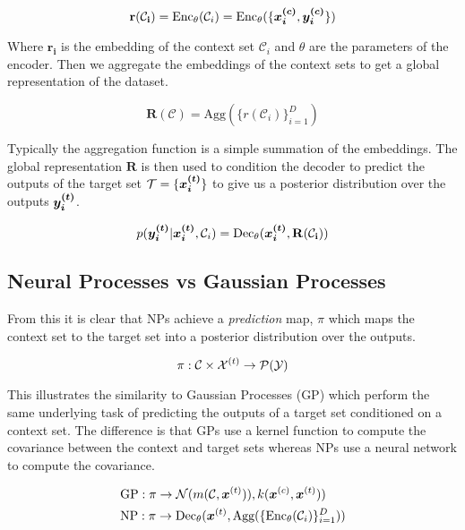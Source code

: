 \documentclass[main.tex]{subfiles}
\begin{document}
\begin{equation}
    \mathbf{r(\mathcal{C}_i)} = \text{Enc}_\theta(\mathcal{C}_i) = \text{Enc}_\theta(\{ \bm{x_{i}^{(c)}}, \bm{y_i^{(c)}} \})
\end{equation}

Where $\mathbf{r_i}$ is the embedding of the context set $\mathcal{C}_i$ and $\theta$ are the parameters of the encoder. Then we aggregate the embeddings of the context sets to get a global representation of the dataset. 

\begin{equation}
    \mathbf{R(\mathcal{C})} = \text{Agg}(\{ r(\mathcal{C}_i) \}_{i=1}^D)
\end{equation}

Typically the aggregation function is a simple summation of the embeddings. The global representation $\mathbf{R}$ is then used to condition the decoder to predict the outputs of the target set $\mathcal{T} = \{ \bm{x_{i}^{(t)}} \}$ to give us a posterior distribution over the outputs $\bm{y_i^{(t)}}$.

\begin{equation}
    p(\bm{y_i^{(t)}} | \bm{x_i^{(t)}}, \mathcal{C}_i) = \text{Dec}_\theta(\bm{x_i^{(t)}}, \mathbf{R(\mathcal{C}_i)})
\end{equation}

\subsection{Neural Processes vs Gaussian Processes}

From this it is clear that NPs achieve a \emph{prediction} map, $\pi$ which maps the context set to the target set into a posterior distribution over the outputs. 

\begin{equation}
    \pi: \mathcal{C} \times \mathcal{X}^{(t)} \rightarrow \mathcal{P}(\mathcal{Y})
\end{equation}


This illustrates the similarity to Gaussian Processes (GP) \cite{books/lib/RasmussenW06} which perform the same underlying task of predicting the outputs of a target set conditioned on a context set. The difference is that GPs use a kernel function to compute the covariance between the context and target sets whereas NPs use a neural network to compute the covariance.

\begin{align}
    &\text{GP}: \pi \rightarrow \mathcal{N}(m(
    \mathcal{C}, \bm{x}^{(t)})
    ), k(\bm{x}^{(c)}, \bm{x}^{(t)})) \\
    &\text{NP}: \pi \rightarrow \text{Dec}_\theta(\bm{x}^{(t)},  
    \text{Agg}(\{ \text{Enc}_\theta(\mathcal{C}_i) \}_{i=1}^D))
\end{align}
\end{document}
